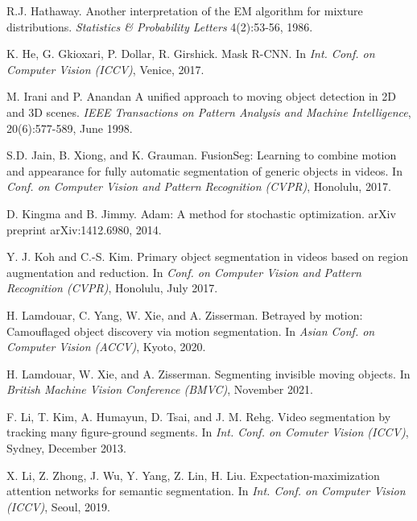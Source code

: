 \documentclass[10pt,twocolumn,letterpaper]{article}
\begin{document}
\begin{thebibliography}{28}
R.J. Hathaway.
\newblock Another interpretation of the EM algorithm for mixture distributions.
\newblock \emph{Statistics \& Probability Letters} 4(2):53-56, 1986.

K. He, G. Gkioxari, P. Dollar, R. Girshick.
\newblock Mask R-CNN.
\newblock In \emph{Int. Conf. on Computer Vision (ICCV)}, Venice, 2017.

M. Irani and P. Anandan
\newblock A unified approach to moving object detection in 2D and 3D scenes.
\newblock \emph{IEEE Transactions on Pattern Analysis and Machine Intelligence}, 20(6):577-589, June 1998.

S.D. Jain, B. Xiong, and K. Grauman.
\newblock FusionSeg: Learning to combine motion and appearance for fully automatic segmentation of generic objects in videos.
\newblock In \emph{Conf. on Computer Vision and Pattern Recognition (CVPR)}, Honolulu, 2017.

D. Kingma and B. Jimmy.
\newblock Adam: A method for stochastic optimization.
\newblock arXiv preprint arXiv:1412.6980, 2014.

Y. J. Koh and C.-S. Kim.
\newblock Primary object segmentation in videos based on region augmentation and reduction.
\newblock In \emph{Conf. on Computer Vision and Pattern Recognition (CVPR)}, Honolulu, July 2017.

H. Lamdouar, C. Yang, W. Xie, and A. Zisserman.
\newblock Betrayed by motion: Camouflaged object discovery via motion segmentation.
\newblock In \emph{Asian Conf. on Computer Vision (ACCV)}, Kyoto, 2020.

H. Lamdouar, W. Xie, and A. Zisserman.
\newblock Segmenting invisible moving objects.
\newblock In \emph{British Machine Vision Conference (BMVC)}, November 2021.





F. Li, T. Kim, A. Humayun, D. Tsai, and J. M. Rehg.
\newblock Video segmentation by tracking many figure-ground segments.
\newblock In \emph{Int. Conf. on Comuter Vision (ICCV)}, Sydney, December 2013.

X. Li, Z. Zhong, J. Wu, Y. Yang, Z. Lin, H. Liu.
\newblock Expectation-maximization attention networks for semantic segmentation.
\newblock In \emph{Int. Conf. on Computer Vision (ICCV)}, Seoul, 2019.


\end{thebibliography}
\end{document}
